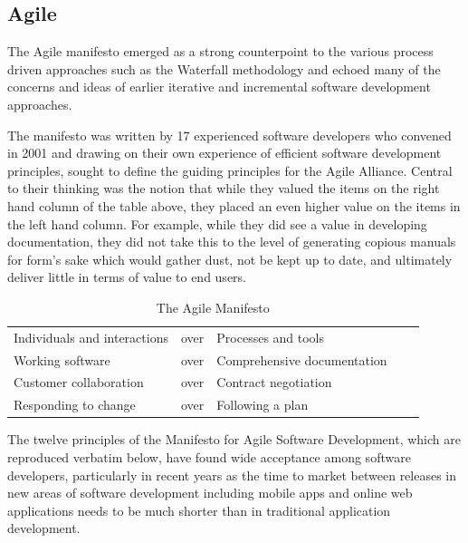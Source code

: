 \documentclass[a4paper,Times New Roman 11pt]{article}
\begin{document}
\begin{samepage}
\begin{samepage}
\subsection {Agile}
The Agile manifesto emerged as a strong counterpoint to the various process driven approaches such as the Waterfall methodology and echoed many of the concerns and ideas of earlier iterative and incremental software development approaches.

The manifesto was written by 17 experienced software developers who convened in 2001 and drawing on their own experience of efficient software development principles, sought to define the guiding principles for the Agile Alliance. Central to their thinking was the notion that while they valued the items on the right hand column of the table above, they placed an even higher value on the items in the left hand column. For example, while they did see a value in developing documentation, they did not take this to the level of generating copious manuals for form's sake which would gather dust, not be kept up to date, and ultimately deliver little in terms of value to end users.

\begin{table}[]
\centering
\caption{The Agile Manifesto}
\label{my-label}
\begin{tabular}{|l|l|l|ll}
\cline{1-3}
Individuals and interactions & over & Processes and tools          \\ \cline{1-3}
Working software             & over & Comprehensive documentation \\ \cline{1-3}
Customer collaboration       & over & Contract negotiation        \\ \cline{1-3}
Responding to change         & over & Following a plan              \\ \cline{1-3}
\end{tabular}
\end{table}

The twelve principles of the Manifesto for Agile Software Development, which are reproduced verbatim below, have found wide acceptance among software developers, particularly in recent years as the time to market between releases in new areas of software development including mobile apps and online web applications needs to be much shorter than in traditional application development. 


\end{samepage}
\end{samepage}
\end{document}
